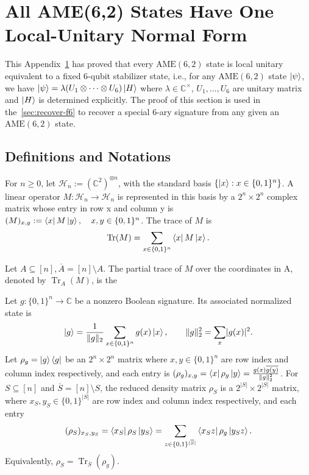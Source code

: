 \section{All AME(6,2) States Have One Local-Unitary Normal Form}\label{sec: AME62 has a common local unitary normal}

This Appendix~\ref{sec: AME62 has a common local unitary normal} has proved that every $\mathrm{AME}(6,2)$ state is local unitary equivalent to a fixed 6-qubit stabilizer state, i.e., for any $\mathrm{AME}(6,2)$ state $\ket{\psi}$, we have $\ket{\psi}=\lambda (U_1\otimes \cdots \otimes U_6)\ket{H}$ where $\lambda\in\mathbb{C}^\times$, $U_1,\dots,U_6$ are unitary matrix and $\ket{H}$ is determined explicitly. The proof of this section is used in the~\cref{sec:recover-f6} to recover a special 6-ary signature from any given an $\mathrm{AME}(6,2)$ state.

\subsection{Definitions and Notations}

\begin{definition}
    For $n\geq 0$, let $\mathcal{H}_n:=(\mathbb{C}^2)^{\otimes n}$, with the standard basis $\{\ket{x}:x\in\{0,1\}^n\}$. A linear operator $M:\mathcal{H}_n\rightarrow \mathcal{H}_n$ is represented in this basis by a $2^n\times 2^n$ complex matrix whose entry in row x and column y is $(M)_{x,y}:=\bra{x}M\ket{y},\quad x,y\in\{0,1\}^n$. The trace of $M$ is 
    \begin{equation}
        \operatorname{Tr}(M)=\sum_{x\in \{0,1\}^n}\bra{x}M\ket{x}.
    \end{equation}

    Let $A\subseteq [n], \overline{A}=[n]\setminus A$. The partial trace of $M$ over the coordinates in A, denoted by $\operatorname{Tr}_A(M)$, is the
\end{definition}

Let $g:\{0,1\}^n\rightarrow \mathbb{C}$ be a nonzero Boolean signature. 
Its associated normalized state is
\begin{equation}
    \ket{g}=\frac{1}{\lVert g\rVert_2}\sum_{x\in\{0,1\}^n} g(x)\ket{x},\quad\quad \lVert g\rVert_2^2=\sum_{x} \lvert g(x)\rvert^2.
\end{equation}
Let $\rho_g=\ket{g}\bra{g}$ be an $2^n \times 2^n$ matrix where $x,y\in\{0,1\}^n$ are row index and column index respectively, and each entry is $(\rho_g)_{x,y}=\bra{x}\rho_g\ket{y}=\frac{g(x)\overline{g(y)}}{\lVert g\rVert_2^2}$. For $S\subseteq [n]$ and $\overline{S}=[n]\setminus S$, the reduced density matrix $\rho_S$ is a $2^{\lvert S\rvert}\times 2^{\lvert S\rvert}$ matrix, where $x_S,y_S\in \{0,1\}^{\lvert S\rvert}$ are row index and column index respectively, and each entry 
\begin{equation}
    (\rho_S)_{x_S,y_S}=\bra{x_S}\rho_S\ket{y_S}=\sum_{z\in \{0,1\}^{\lvert \overline{S}\rvert}} \bra{x_Sz}\rho_g\ket{y_Sz}.
\end{equation}
Equivalently, $\rho_S=\operatorname{Tr}_{\overline{S}}(\rho_g)$. %


